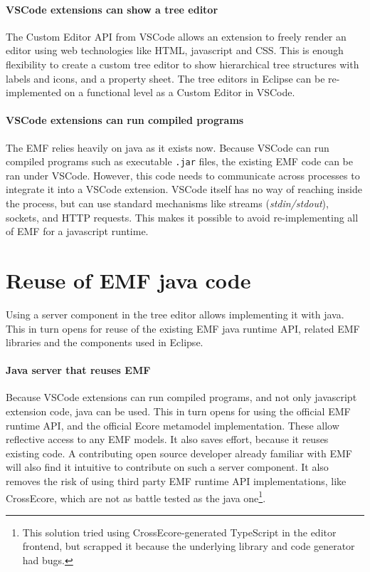 \paragraph{VSCode extensions can show a tree editor}
The Custom Editor \acrshort{API} from \gls{VSCode} allows an extension to freely render an editor using web technologies like HTML, javascript and CSS.
This is enough flexibility to create a custom tree editor to show hierarchical tree structures with labels and icons, and a property sheet.
The tree editors in \gls{Eclipse} can be re-implemented on a functional level as a Custom Editor in \gls{VSCode}.

\paragraph{VSCode extensions can run compiled programs}
The \acrlong{EMF} relies heavily on java as it exists now.
Because \gls{VSCode} can run compiled programs such as executable \texttt{.jar} files, the existing \acrshort{EMF} code can be ran under \gls{VSCode}.
However, this code needs to communicate across processes to integrate it into a \gls{VSCode} extension.
\gls{VSCode} itself has no way of reaching inside the process, but can use standard mechanisms like streams (\textit{stdin/stdout}), sockets, and HTTP requests.
This makes it possible to avoid re-implementing all of \acrshort{EMF} for a javascript runtime.

\section{Reuse of EMF java code}

Using a server component in the tree editor allows implementing it with java.
This in turn opens for reuse of the existing \acrshort{EMF} java runtime \acrshort{API}, related \acrshort{EMF} libraries and the components used in \gls{Eclipse}.

\paragraph{Java server that reuses EMF}
Because \gls{VSCode} extensions can run compiled programs, and not only javascript extension code, java can be used.
This in turn opens for using the official \acrshort{EMF} runtime \acrshort{API}, and the official \gls{Ecore} metamodel implementation.
These allow reflective access to any \acrshort{EMF} models.
It also saves effort, because it reuses existing code.
A contributing \gls{open source} developer already familiar with \acrshort{EMF} will also find it intuitive to contribute on such a server component.
It also removes the risk of using third party \gls{EMF} runtime \acrshort{API} implementations, like CrossEcore, which are not as battle tested as the java one\footnote{This solution tried using CrossEcore-generated TypeScript in the editor frontend, but scrapped it because the underlying library and code generator had bugs.}.\\

